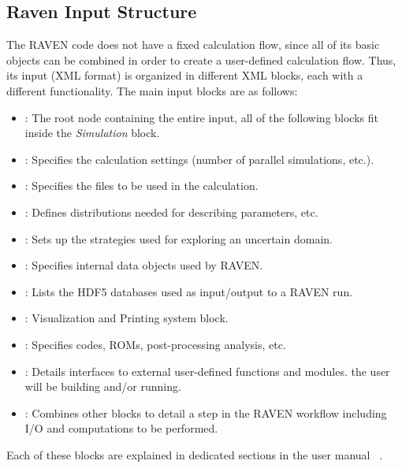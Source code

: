 \subsection{Raven Input Structure}
\label{sub:InputStructure}
The RAVEN code does not have a fixed calculation flow, since all of its basic
objects can be combined in order to create a user-defined calculation flow.
%
Thus, its input (XML format) is organized in different XML blocks, each with a
different functionality.
%
The main input blocks are as follows:
\begin{itemize}
  \item {}: The root node containing the
  entire input, all of
  the following blocks fit inside the \emph{Simulation} block.
  \item {}: Specifies the calculation
  settings (number of parallel simulations, etc.).
  \item {}: Specifies the files to be
  used in the calculation.
  \item {}: Defines distributions
  needed for describing parameters, etc.
  \item {}: Sets up the strategies used for
  exploring an uncertain domain.
  \item {}: Specifies internal data objects
  used by RAVEN.
  \item {}: Lists the HDF5 databases used
  as input/output to a
  RAVEN run.
  \item {}: Visualization and
  Printing system block.
  \item {}: Specifies codes, ROMs,
  post-processing analysis, etc.
  \item {}: Details interfaces to external
  user-defined functions and modules.
  the user will be building and/or running.
  \item {}: Combines other blocks to detail a
  step in the RAVEN workflow including I/O and computations to be performed.
\end{itemize}

Each of these blocks are explained in dedicated sections in the user manual ~\cite{RAVENuserManual}.
%
